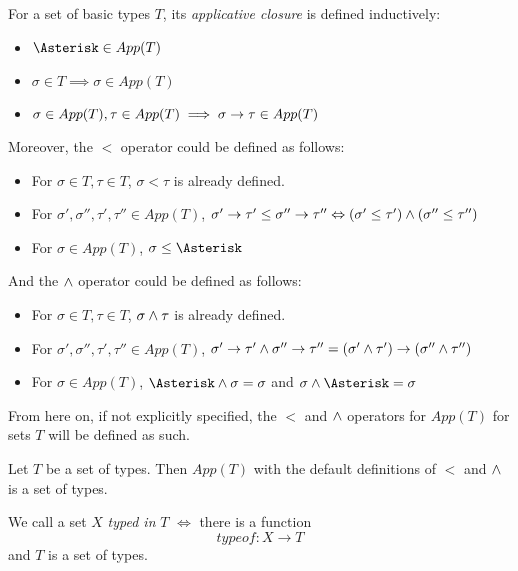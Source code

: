 \documentclass[main.tex]{subfiles}
\begin{document}
\begin{defn}
    For a set of basic types $T$, its \emph{applicative closure} is defined inductively:
    \begin{itemize}
        \item $\wildcard \in App(T)$
        \item $\sigma \in T \implies \sigma \in App(T)$
        \item $\sigma \in App(T), \tau \in App(T) \implies \sigma \rightarrow \tau \in App(T)$
    \end{itemize}

    Moreover, the $\less$ operator could be defined as follows:
    \begin{itemize}
        \item For $\sigma \in T, \tau \in T$, $\sigma \less \tau$ is already defined.
        \item For $\sigma', \sigma'', \tau', \tau'' \in App(T)$,
                  $\sigma' \rightarrow \tau' \leq \sigma'' \rightarrow \tau''
                  \Leftrightarrow (\sigma' \leq \tau') \land (\sigma'' \leq \tau'')$
        \item For $\sigma \in App(T)$, $\sigma \less \wildcard$
    \end{itemize}


    And the $\wedge$ operator could be defined as follows:
    \begin{itemize}
        \item For $\sigma \in T, \tau \in T$, $\sigma \wedge \tau$ is already defined.
        \item For $\sigma', \sigma'', \tau', \tau'' \in App(T)$,
                  $\sigma' \rightarrow \tau' \wedge \sigma'' \rightarrow \tau''
                  = (\sigma' \wedge \tau') \rightarrow (\sigma'' \wedge \tau'')$
        \item For $\sigma \in App(T)$, $\wildcard \meet \sigma = \sigma$
                                   and $\sigma \meet \wildcard = \sigma$
    \end{itemize}

    From here on, if not explicitly specified, the $\less$ and $\wedge$ operators
    for $App(T)$ for sets $T$ will be defined as such.
\end{defn}

\begin{prop}
    Let $T$ be a set of types.
    Then $App(T)$ with the default definitions of $\less$ and $\wedge$
    is a set of types.
\end{prop}

\begin{defn}
    We call a set $X$ \emph{typed in} $T$ $\iff$ there is a function
    \[ typeof : X \rightarrow T \] and $T$ is a set of types.
\end{defn}
\end{document}
